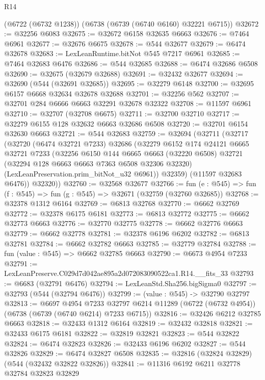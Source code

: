 \begin{lexlean}{R14}
\begin{coremodule}
    (@6722 (@6732 @1238))
    (@6738 (@6739 (@6740 @6160) @32221 @6715))
@32672 := @32256 @6083
@32675 := @32672 @6158 @32635 @6663
@32676 := @7464 @6961
@32677 := @32676 @6675
@32678 := @544 @32677
@32679 := @6474 @32678
@32683 := LexLeanRuntime.bitNot @545 @7217 @6961
@32685 := @7464 @32683 @6476
@32686 := @544 @32685
@32688 := @6474 @32686 @6508
@32690 := @32675 (@32679 @32688)
@32691 := @32432 @32677
@32694 := @32690 (@544 (@32691 @32685))
@32695 := @32279 @6148
@32700 := @32695 @6157 @6668 @32634 @32678 @32688
@32701 := @32256 @562
@32707 := @32701 @284 @6666 @6663 @32291 @32678 @32322
@32708 := @11597 @6961
@32710 := @32707 (@32708 @6675)
@32711 := @32700 @32710
@32717 := @32279 @6155 @128 @32632 @6663 @32686 @6508
@32720 := @32701 @6154 @32630 @6663
@32721 := @544 @32683
@32759 := @32694
    (@32711
      (@32717
        (@32720
          (@6474 @32721 @7233)
          @32686
          (@32279
            @6152
            @174
            @24121
            @6665
            @32721
            @7233
            (@32256
              @6150
              @144
              @6665
              @6663
              (@32220 @6508)
              @32721
              (@32294 @128 @6663 @6663 @7363 @6508 @32306 @32320)
              (LexLeanPreservation.prim_bitNot_u32 @6961))
            @32359)
          (@11597 @32683 @6476))
        @32320))
@32760 := @32568 @32677
@32766 := fun (e : @545) => fun (f : @545) => fun (g : @545) => @32671 (@32759 (@32760 @32685))
@32768 := @32378 @1312 @6164
@32769 := @6813 @32768
@32770 := @6662 @32769
@32772 := @32378 @6175 @6181
@32773 := @6813 @32772
@32775 := @6662 @32773 @6663
@32776 := @32770 @32775
@32778 := @6662 @32776 @6663
@32779 := @6662 @32778
@32781 := @32378 @6196 @6202
@32782 := @6813 @32781
@32784 := @6662 @32782 @6663
@32785 := @32779 @32784
@32788 := fun (value : @545) => @6662 @32785 @6663
@32790 := @6673 @4954 @7233
@32791 := LexLeanPreserve.C029d7d042ae895a2d072083090522ca1.R14.__fits_33
@32793 := @6683 (@32791 @6476)
@32794 := LexLeanStd.Sha256.bigSigma0
@32797 := @32793 (@544 (@32794 @6476))
@32799 := (value : @545) -> @32790 @32797
@32813 := @6697
    @4954
    @7233
    @32797
    @6214
    @11289
    (@6722 (@6732 @4954))
    (@6738 (@6739 (@6740 @6214) @7233 @6715))
@32816 := @32426 @6212 @32785 @6663
@32818 := @32433 @1312 @6164
@32819 := @32432 @32818
@32821 := @32433 @6175 @6181
@32822 := @32819 @32821
@32823 := @544 @32822
@32824 := @6474 @32823
@32826 := @32433 @6196 @6202
@32827 := @544 @32826
@32829 := @6474 @32827 @6508
@32835 := @32816 (@32824 @32829) (@544 (@32432 @32822 @32826))
@32841 := @11316 @6192 @6211 @32778 @32784 @32823 @32829

\end{coremodule}
\end{lexlean}
